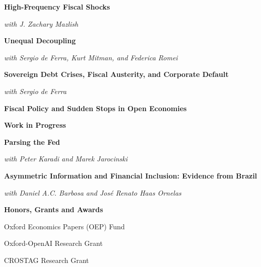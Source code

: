 \documentclass[letterpaper,10pt,oneside]{article}
\begin{document}
\noindent \textbf{High-Frequency Fiscal Shocks}

\noindent \textit{with J. Zachary Mazlish}

\vspace{1.5mm}

\noindent \textbf{Unequal Decoupling}

\noindent \textit{with Sergio de Ferra, Kurt Mitman, and Federica Romei}

\vspace{1.5mm}

\noindent \textbf{Sovereign Debt Crises, Fiscal Austerity, and Corporate Default}

\noindent \textit{with Sergio de Ferra}

\vspace{1.5mm}

\noindent \textbf{Fiscal Policy and Sudden Stops in Open Economies}

\vspace{4mm}

\noindent \large \textbf{Work in Progress}

\vspace{3mm} \normalsize

\noindent \textbf{Parsing the Fed}

\noindent \textit{with Peter Karadi and Marek Jarocinski}

\vspace{1.5mm}

\noindent \textbf{Asymmetric Information and Financial Inclusion: Evidence from Brazil}

\noindent \textit{with Daniel A.C. Barbosa and Jos\'e Renato Haas Ornelas}

\vspace{4mm}


\noindent \large \textbf{Honors, Grants and Awards}
\vspace{2mm} \normalsize

\noindent Oxford Economics Papers (OEP) Fund \hfill \begin{minipage}[t]{6cm} \end{minipage}

\noindent Oxford-OpenAI Research Grant \hfill \begin{minipage}[t]{6cm} \end{minipage}

\noindent CROSTAG Research Grant \hfill \begin{minipage}[t]{6cm} \end{minipage}
\end{document}
